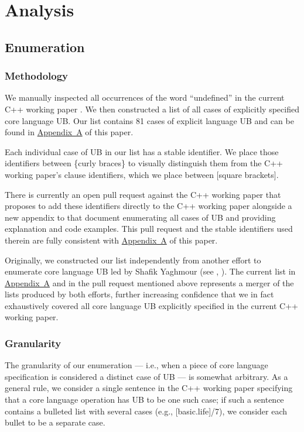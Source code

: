 \section{Analysis}
\label{analysis}

\subsection{Enumeration}

\subsubsection{Methodology}

We manually inspected all occurrences of the word ``undefined'' in the current C++ working paper \cite{N5008}. We then constructed a list of all cases of explicitly specified core language UB. Our list contains 81 cases of explicit language UB and can be found in \hyperref[appendix]{Appendix~A} of this paper. 

Each individual case of UB in our list has a stable identifier. We place those identifiers between \{curly braces\} to visually distinguish them from the C++ working paper's clause identifiers, which we place between [square brackets]. 

There is currently an open pull request against the C++ working paper that proposes to add these identifiers directly to the C++ working paper alongside a new appendix to that document enumerating all cases of UB and providing explanation and code examples. This pull request and the stable identifiers used therein are fully consistent with \hyperref[appendix]{Appendix~A} of this paper. 

Originally, we constructed our list independently from another effort to enumerate core language UB led by Shafik Yaghmour (see \cite{P1705R1}, \cite{P3075R0}). The current list in \hyperref[appendix]{Appendix~A} and in the pull request mentioned above represents a merger of the lists produced by both efforts, further increasing confidence that we in fact exhaustively covered all core language UB explicitly specified in the current C++ working paper.

\subsubsection{Granularity}

The granularity of our enumeration --- i.e., when a piece of core language specification is considered a distinct case of UB --- is somewhat arbitrary. As a general rule, we consider a single sentence in the C++ working paper specifying that a core language operation has UB to be one such case; if such a sentence contains a bulleted list with several cases (e.g., [basic.life]/7), we consider each bullet to be a separate case.

